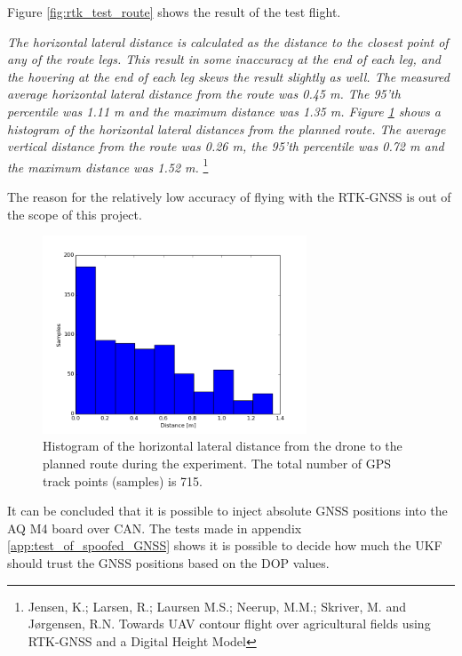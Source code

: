 Figure \ref{fig:rtk_test_route} shows the result of the test flight. 



\textit{The horizontal lateral distance is calculated as the distance to the closest point of any of the route legs.
This result in some inaccuracy at the end of each leg, and the hovering at the end of each leg skews the result slightly as well.
The measured average horizontal lateral distance from the route was 0.45 m.
The 95’th percentile was 1.11 m and the maximum distance was 1.35 m.
Figure \ref{fig:rtk_test_hist} shows a histogram of the horizontal lateral distances from the planned route.
The average vertical distance from the route was 0.26 m, the 95’th percentile was 0.72 m and the maximum distance was 1.52 m.} \footnote{Jensen, K.; Larsen, R.; Laursen M.S.; Neerup, M.M.; Skriver, M. and Jørgensen, R.N. Towards UAV contour flight over agricultural fields using RTK-GNSS and a Digital Height Model}

The reason for the relatively low accuracy of flying with the RTK-GNSS is out of the scope of this project.

\begin{figure}[H]
    \center
    \includegraphics[width=0.7\textwidth]{graphics/rtk_test_hist_dist.png}
    \caption{Histogram of the horizontal lateral distance from the drone to the planned
route during the experiment. The total number of GPS track points (samples) is 715.}
    \label{fig:rtk_test_hist}
\end{figure}

It can be concluded that it is possible to inject absolute GNSS positions into the \ac{AQ} M4 board over \ac{CAN}. The tests made in appendix \ref{app:test_of_spoofed_GNSS} shows it is possible to decide how much the UKF should trust the GNSS positions based on the DOP values.